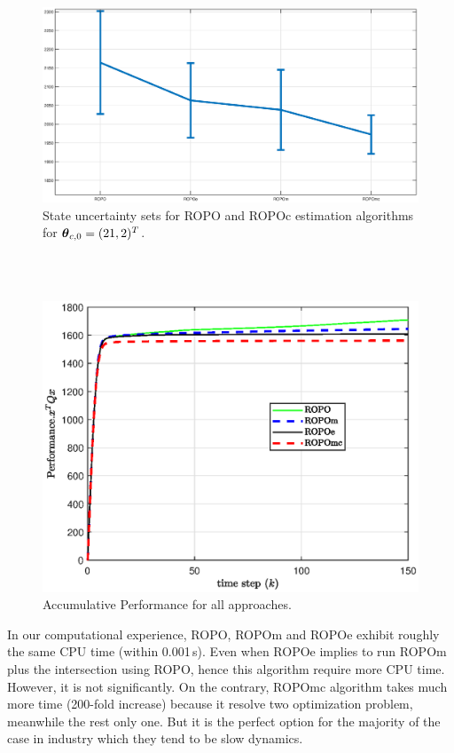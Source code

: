 \documentclass{ifacconf}
\def\ve#1{\mathchoice{\mbox{\boldmath$\displaystyle#1$}}
{\mbox{\boldmath$\textstyle#1$}}
{\mbox{\boldmath$\scriptstyle#1$}}
{\mbox{\boldmath$\scriptscriptstyle#1$}}}
\begin{document}
\begin{figure}
  \centering
  \includegraphics*[width=0.95\linewidth]{stdApproaches}
  \caption{State uncertainty sets for ROPO and ROPOc estimation algorithms for $\ve\theta_{c,0} = (21, 2)^T$.}
  \label{fig:stdApproaches}
\end{figure}
\\
\\
\begin{figure}
  \centering
  \includegraphics[width=0.8\linewidth]{Performance}
  \caption{Accumulative Performance for all approaches.}
  \label{fig:case_constrained_variable}
\end{figure}
In our computational experience, ROPO, ROPOm and ROPOe exhibit roughly the same CPU time (within 0.001\,s). Even when ROPOe implies to run ROPOm plus the intersection using ROPO, hence this algorithm require more CPU time. However, it is not significantly. On the contrary, ROPOmc algorithm takes much more time (200-fold increase) because it resolve two optimization problem, meanwhile the rest only one. But it is the perfect option for the majority of the case in industry which they tend to be slow dynamics.
\end{document}
